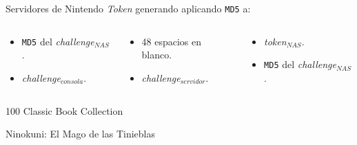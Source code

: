 \begin{frame}{Servidores de Nintendo}
\textit{Token} generando aplicando \texttt{MD5} a:
\begin{columns}

\begin{column}{0.33\textwidth}\begin{itemize}
    \item \texttt{MD5} del \textit{challenge}$_{NAS}$.
    \item \textit{challenge}$_{consola}$.
\end{itemize}\end{column}

\begin{column}{0.33\textwidth}\begin{itemize}
    \item 48 espacios en blanco.
    \item \textit{challenge}$_{servidor}$.
\end{itemize}\end{column}

\begin{column}{0.33\textwidth}\begin{itemize}
    \item \textit{token}$_{NAS}$.
    \item \texttt{MD5} del \textit{challenge}$_{NAS}$.
\end{itemize}\end{column}

\end{columns}
\end{frame}

\begin{frame}{100 Classic Book Collection}

\end{frame}

\begin{frame}{Ninokuni: El Mago de las Tinieblas}

\end{frame}

\backupend
